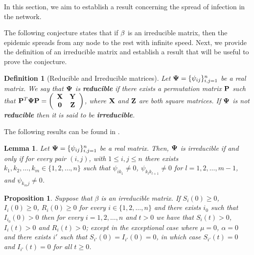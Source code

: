 \documentclass[a4paper,10pt]{article}
\newtheorem{lem}[thm]{Lemma}
\newtheorem{defn}[thm]{Definition}
\newtheorem{prop}[thm]{Proposition}
\theoremstyle{remark}
\begin{document}
 


In this section, we aim to establish a result concerning the spread of infection in the network.

The following conjecture states that if $\bold{\beta}$ is an irreducible matrix, then the epidemic spreads from any node to the rest with infinite speed. Next, we provide the definition of an irreducible matrix and establish a result that will be useful to prove the conjecture.

\begin{defn}[Reducible and Irreducible matrices]
Let $\bold{\Psi}=\{\psi_{ij}\}_{i,j=1}^n$ be a real matrix. We say that $\bold{\Psi}$ is \textbf{reducible} if there exists a permutation matrix $\bold{P}$ such that $\bold{P}^{T}\bold{\Psi}\bold{P}=\left(\begin{array}{cc}
     \bold{X}  & \bold{Y}\\
     \bold{0} &  \bold{Z}
\end{array}\right)$, where $\bold{X}$ and $\bold{Z}$ are both square matrices. If $\bold{\Psi}$ is not \textbf{reducible} then it is said to be \textbf{irreducible}.
\end{defn}

The following results can be found in \cite{CarlD.Meyer538}.

\begin{lem}\label{lema:Psi.irredusible<-->Grafofuert.conectado}
Let $\bold{\Psi}=\{\psi_{ij}\}_{i,j=1}^n$ be a real matrix. Then, $\bold{\Psi}$ is irreducible if and only if for every pair $(i,j)$, with $1\leq i,j\leq n$ there exists $k_1,k_2,\ldots,k_m\in \{1,2,\ldots,n\}$ such that $\psi_{ik_1}\neq 0$, $\psi_{k_lk_{l+1}}\neq 0$ for $l=1,2,\ldots,m-1$, and $\psi_{k_mj}\neq 0$.
\end{lem}

 

 

\begin{prop}\label{propo:propagacion.en.la.red} Suppose that $\beta$ is an irreducible matrix. If $S_i(0)\geq 0$, $I_i(0)\geq 0$, $R_i(0)\geq 0$ for every $i\in\{1,2,\ldots,n\}$ and there exists $i_0$ such that $I_{i_0}(0)>0$ then for every $i=1,2,\ldots,n$ and $t>0$ we have that $S_i(t)>0$, $I_i(t)>0$ and $R_i(t)>0$; except in the exceptional case where  $\mu=0$, $\alpha=0$ and  there exists $i'$ such that $S_{i'}(0)=I_{i'}(0)=0$, in which case  
$S_{i'}(t)=0$ and $I_{i'}(t)=0$ for all $t\geq 0$.
\end{prop}
 
\end{document}
